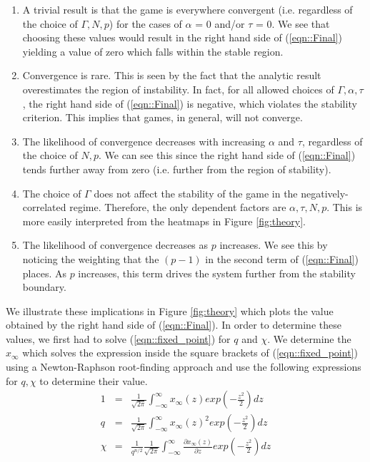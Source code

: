\documentclass[sigconf,anonymous]{aamas}
\newcommand{\xfixed}{x_\infty}
\begin{document}
\begin{enumerate}
    \item A trivial result is that the game is everywhere convergent (i.e. regardless of the choice of $\Gamma, N, p$) for the cases of $\alpha$ = 0 and/or $\tau$ = 0.  We see that choosing these values would result in the right hand side of (\ref{eqn::Final}) yielding a value of zero which falls within the stable region.
    \item Convergence is rare. This is seen by the fact that the analytic result overestimates the region of instability. In fact, for all allowed choices of $\Gamma, \alpha, \tau$, the right hand side of (\ref{eqn::Final}) is negative, which violates the stability criterion. This implies that games, in general, will not converge.
    \item The likelihood of convergence decreases with increasing $\alpha$ and $\tau$, regardless of the choice of $N, p$. We can see this since the right hand side of (\ref{eqn::Final}) tends further away from zero (i.e. further from the region of stability).
    \item The choice of $\Gamma$ does not affect the stability of the game in the negatively-correlated regime. Therefore, the only dependent factors are $\alpha, \tau, N, p$. This is more easily interpreted from the heatmaps in Figure \ref{fig:theory}.
    \item The likelihood of convergence decreases as $p$ increases. We see this by noticing the weighting that the $(p-1)$ in the second term of (\ref{eqn::Final}) places. As $p$ increases, this term drives the system further from the stability boundary.

\end{enumerate}

We illustrate these implications in Figure \ref{fig:theory} which plots the value obtained by the right hand side of (\ref{eqn::Final}). In order to determine these values, we first had to solve (\ref{eqn::fixed_point}) for $q$ and $\chi$. We determine the $\xfixed$ which solves the expression inside the square brackets of (\ref{eqn::fixed_point}) using a Newton-Raphson root-finding approach and use the following expressions for $q, \chi$ to determine their value. 
%
\begin{eqnarray*}
        1 & = & \frac{1}{\sqrt{2 \pi}} \int_{-\infty}^{\infty} \xfixed(z) exp(-\frac{z^2}{2}) dz \\ 
        q & = & \frac{1}{\sqrt{2 \pi}} \int_{-\infty}^{\infty} \xfixed(z)^2 exp(-\frac{z^2}{2}) dz \\ 
        \chi & = & \frac{1}{q^{n/2}}\frac{1}{\sqrt{2 \pi}} \int_{-\infty}^{\infty} \frac{\partial \xfixed (z)}{\partial z} exp(-\frac{z^2}{2}) dz
\end{eqnarray*}
\end{document}
